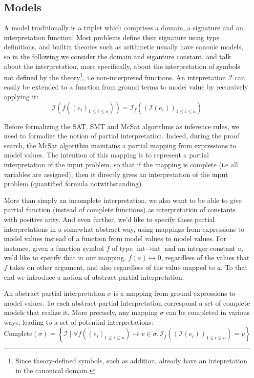 \documentclass{article}
\begin{document}
\subsection{Models}

A model traditionally is a triplet which comprises a domain, a signature and an interpretation function.
Most problems define their signature using type definitions, and builtin theories such as arithmetic
usually have canonic models, so in the following we consider the domain and siganture constant, and
talk about the interpretation, more specifically, about the interpretation of symbols not defined
by the theory\footnote{Since theory-defined symbols, such as addition, already have an intepretation
in the canonical domain.}, i.e non-interpreted functions. An intepretation $\mathcal{I}$ can easily
be extended to a function from ground terms to model value by recursively applying it:
\[
  \mathcal{I}( f ( {(e_i)}_{1\leq i \leq n})) = \mathcal{I}_f ( {( \mathcal{I}(e_i) )}_{1 \leq i \leq n} )
\]

Before formalizing the SAT, SMT and McSat algorithms as inference rules, we need to formalize the notion
of partial interpretation. Indeed, during the proof search, the McSat algorithm maintains a partial mapping from
expressions to model values. The intention of this mapping is to represent a partial interpretation of the input
problem, so that if the mapping is complete (i.e all variables are assigned), then it directly gives an interpretation
of the input problem (quantified formula notwithstanding).

More than simply an incomplete interpretation, we also want to be able to give partial function (instead of complete functions) as interpretation of
constants with positive arity. And even further, we'd like to specify these partial interpretations in a somewhat
abstract way, using mappings from expressions to model values instead of a function from model values to model
values. For instance, given a function symbol $f$ of type $\text{int} \rightarrow \text{int}$ and an integer constant $a$, we'd like to specify that in our mapping,
$f(a) \mapsto 0$, regardless of the values that $f$ takes on other argument, and also regardless
of the value mapped to $a$. To that end we introduce a notion of abstract partial interpretation.

An abstract partial interpretation $\sigma$ is a mapping from ground expressions to model values. To each abstract partial
interpretation correspond a set of complete models that realize it. More precisely, any mapping $\sigma$ can be completed
in various ways, leading to a set of potential interpretations:
\[
  \text{Complete}(\sigma) =
    \left\{
      \mathcal{I}
      \; | \;
      \forall f( {(e_i)}_{1 \leq i \leq n} ) \mapsto v \in \sigma ,
        \mathcal{I}_f ( {( \mathcal{I}(e_i) )}_{1 \leq i \leq n} ) = v
    \right\}
\]
\end{document}
